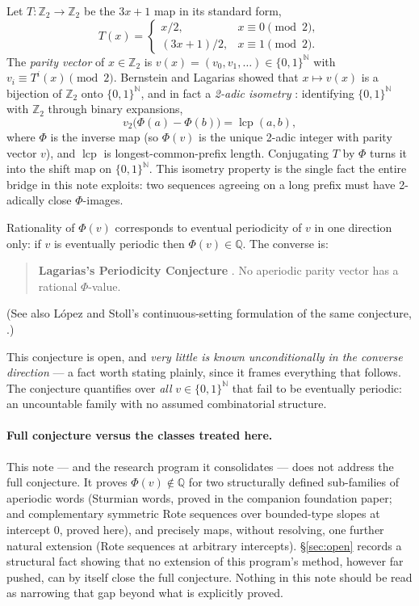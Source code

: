 \documentclass[11pt]{article}
\newcommand{\Q}{\mathbb{Q}}
\newcommand{\Z}{\mathbb{Z}}
\newcommand{\N}{\mathbb{N}}
\begin{document}
Let $T:\Z_2\to\Z_2$ be the $3x+1$ map in its standard form,
\[
T(x)=\begin{cases} x/2, & x\equiv 0 \pmod 2,\\ (3x+1)/2, & x\equiv 1\pmod 2.\end{cases}
\]
The \emph{parity vector} of $x\in\Z_2$ is $v(x)=(v_0,v_1,\dots)\in\{0,1\}^\N$ with $v_i\equiv T^i(x)\pmod 2$. Bernstein and Lagarias showed that $x\mapsto v(x)$ is a bijection of $\Z_2$ onto $\{0,1\}^\N$, and in fact a \emph{2-adic isometry} \cite{BernsteinLagarias1996,Bernstein1994}: identifying $\{0,1\}^\N$ with $\Z_2$ through binary expansions,
\[
v_2\bigl(\Phi(a)-\Phi(b)\bigr) = \operatorname{lcp}(a,b),
\]
where $\Phi$ is the inverse map (so $\Phi(v)$ is the unique 2-adic integer with parity vector $v$), and $\operatorname{lcp}$ is longest-common-prefix length. Conjugating $T$ by $\Phi$ turns it into the shift map on $\{0,1\}^\N$. This isometry property is the single fact the entire bridge in this note exploits: two sequences agreeing on a long prefix must have 2-adically close $\Phi$-images.

Rationality of $\Phi(v)$ corresponds to eventual periodicity of $v$ in one direction only: if $v$ is eventually periodic then $\Phi(v)\in\Q$. The converse is:

\begin{quote}
\textbf{Lagarias's Periodicity Conjecture} \cite[\S2]{Lagarias1985}. No aperiodic parity vector has a rational $\Phi$-value.
\end{quote}
(See also López and Stoll's continuous-setting formulation of the same conjecture, \cite{LopezStoll2021}.)

This conjecture is open, and \emph{very little is known unconditionally in the converse direction} --- a fact worth stating plainly, since it frames everything that follows. The conjecture quantifies over \emph{all} $v\in\{0,1\}^\N$ that fail to be eventually periodic: an uncountable family with no assumed combinatorial structure.

\paragraph{Full conjecture versus the classes treated here.} This note --- and the research program it consolidates --- does not address the full conjecture. It proves $\Phi(v)\notin\Q$ for two structurally defined sub-families of aperiodic words (Sturmian words, proved in the companion foundation paper; and complementary symmetric Rote sequences over bounded-type slopes at intercept $0$, proved here), and precisely maps, without resolving, one further natural extension (Rote sequences at arbitrary intercepts). \S\ref{sec:open} records a structural fact showing that no extension of this program's method, however far pushed, can by itself close the full conjecture. Nothing in this note should be read as narrowing that gap beyond what is explicitly proved.
\end{document}

